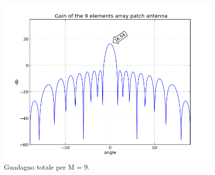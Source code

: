 \begin{figure}
\centering
\caption{Guadagno totale per M = 9.}
\label{img:gain9}
\includegraphics[scale=0.5]{Immagini/gain9}
\end{figure}


